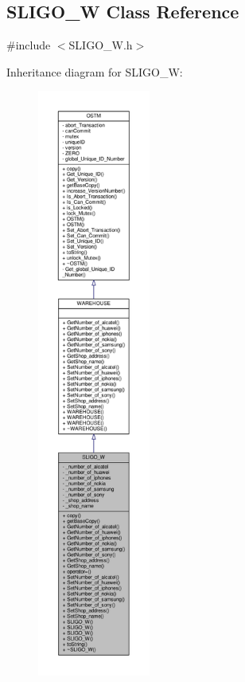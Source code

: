 \hypertarget{class_s_l_i_g_o___w}{}\subsection{S\+L\+I\+G\+O\+\_\+W Class Reference}
\label{class_s_l_i_g_o___w}


{\ttfamily \#include $<$S\+L\+I\+G\+O\+\_\+\+W.\+h$>$}



Inheritance diagram for S\+L\+I\+G\+O\+\_\+W\+:\nopagebreak
\begin{figure}[H]
\begin{center}
\leavevmode
\includegraphics[height=550pt]{class_s_l_i_g_o___w__inherit__graph}
\end{center}
\end{figure}


